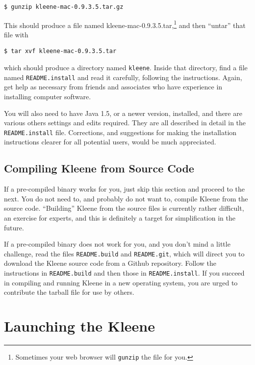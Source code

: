 \begin{Verbatim}
$ gunzip kleene-mac-0.9.3.5.tar.gz
\end{Verbatim}

\noindent
This should produce a file named kleene-mac-0.9.3.5.tar,\footnote{Sometimes 
your web browser will \texttt{gunzip} the file for you.} and then ``untar'' that file with

\begin{Verbatim}
$ tar xvf kleene-mac-0.9.3.5.tar
\end{Verbatim}

\noindent
which should produce a directory named \texttt{kleene}.  Inside that directory, 
find a file named \texttt{README.install} and read it carefully, following the 
instructions.  Again, get help as necessary from friends and associates who have 
experience in installing computer
software.

You will also need to have Java 1.5, or a newer version, installed, and
there are various others settings and edits required.  They are all
described in detail in the \texttt{README.install} file.
Corrections, and suggestions for making the installation instructions clearer for all
potential users, would be much appreciated.

\subsection{Compiling Kleene from Source Code}

If a pre-compiled binary works for you, just skip this section and proceed to the next.
You do not need to, and probably do not want to, compile Kleene from the
source code.  ``Building'' Kleene from the source files is currently
rather difficult, an exercise for experts, and this is definitely a target
for simplification in the future.

If a pre-compiled binary does not work for you, and you don't mind a little
challenge, read the files \texttt{README.build} and \texttt{README.git},
which will direct you to download the Kleene source code from a Github
repository.  Follow the instructions in \texttt{README.build} and then
those in \texttt{README.install}.  If you succeed in compiling and running
Kleene in a new operating system, you are urged to contribute the
tarball file for use by others.

\section{Launching the Kleene }

